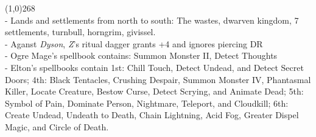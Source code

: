 \documentclass[letterpaper]{article}
\newcommand{\colline}{\noindent\line(1,0){268} \\}
\newcommand{\e}[1]{\emph{#1}}
\newcommand{\B}[1]{\textbf{#1}}
\newenvironment{notesection}[1]
{\noindent {\huge \B{#1}} \par
\vspace{-0.75em}
\colline
\begingroup\fontsize{9pt}{12pt}\selectfont}
{\endgroup}
\begin{document}
\begin{notesection}{Notes}
\noindent - Lands and settlements from north to south: The wastes, dwarven kingdom, 7 settlements, turnbull, horngrim, givissel.\\
\noindent - Aganst \e{Dyson}, \e{Z}'s ritual dagger grants +4 and ignores piercing DR\\
\noindent - Ogre Mage's spellbook contains: Summon Monster II, Detect Thoughts\\
\noindent - Elton's spellbooks contain 1st: Chill Touch, Detect Undead, and Detect Secret Doors; 4th: Black Tentacles, Crushing Despair, Summon Monster IV, Phantasmal Killer, Locate Creature, Bestow Curse, Detect Scrying, and Animate Dead; 5th: Symbol of Pain, Dominate Person, Nightmare, Teleport, and Cloudkill; 6th: Create Undead, Undeath to Death, Chain Lightning, Acid Fog, Greater Dispel Magic, and Circle of Death.\\\\
\end{notesection}
\end{document}
